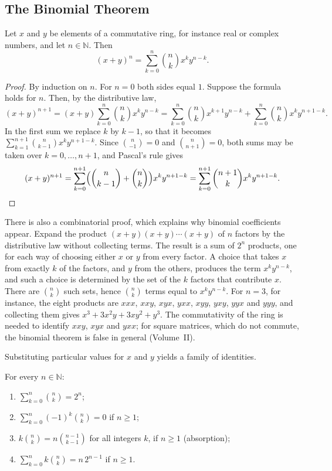 \subsection{The Binomial Theorem}

\begin{theorem}
\label{thm:binomial}
Let $x$ and $y$ be elements of a commutative ring, for instance real or complex numbers, and let $n\in\mathbb N$. Then
\[
(x+y)^n=\sum_{k=0}^{n}\binom nk x^ky^{n-k}.
\]
\end{theorem}

\begin{proof}
By induction on $n$. For $n=0$ both sides equal $1$. Suppose the formula holds for $n$. Then, by the distributive law,
\[
(x+y)^{n+1}=(x+y)\sum_{k=0}^{n}\binom nk x^ky^{n-k}=\sum_{k=0}^{n}\binom nk x^{k+1}y^{n-k}+\sum_{k=0}^{n}\binom nk x^ky^{n+1-k}.
\]
In the first sum we replace $k$ by $k-1$, so that it becomes $\sum_{k=1}^{n+1}\binom n{k-1}x^ky^{n+1-k}$. Since $\binom n{-1}=0$ and $\binom n{n+1}=0$, both sums may be taken over $k=0,\ldots,n+1$, and Pascal's rule gives
\[
(x+y)^{n+1}=\sum_{k=0}^{n+1}\Bigl(\binom n{k-1}+\binom nk\Bigr)x^ky^{n+1-k}=\sum_{k=0}^{n+1}\binom{n+1}{k}x^ky^{n+1-k}.
\]
\end{proof}

There is also a combinatorial proof, which explains why binomial coefficients appear. Expand the product $(x+y)(x+y)\cdots(x+y)$ of $n$ factors by the distributive law without collecting terms. The result is a sum of $2^n$ products, one for each way of choosing either $x$ or $y$ from every factor. A choice that takes $x$ from exactly $k$ of the factors, and $y$ from the others, produces the term $x^ky^{n-k}$, and such a choice is determined by the set of the $k$ factors that contribute $x$. There are $\binom nk$ such sets, hence $\binom nk$ terms equal to $x^ky^{n-k}$. For $n=3$, for instance, the eight products are $xxx$, $xxy$, $xyx$, $yxx$, $xyy$, $yxy$, $yyx$ and $yyy$, and collecting them gives $x^3+3x^2y+3xy^2+y^3$. The commutativity of the ring is needed to identify $xxy$, $xyx$ and $yxx$; for square matrices, which do not commute, the binomial theorem is false in general (Volume~II).

Substituting particular values for $x$ and $y$ yields a family of identities.

\begin{corollary}
\label{cor:binomial-sums}
For every $n\in\mathbb N$:
\begin{enumerate}
\item $\sum_{k=0}^{n}\binom nk=2^n$;
\item $\sum_{k=0}^{n}(-1)^k\binom nk=0$ if $n\ge1$;
\item $k\binom nk=n\binom{n-1}{k-1}$ for all integers $k$, if $n\ge1$ \quad(absorption);
\item $\sum_{k=0}^{n}k\binom nk=n\,2^{n-1}$ if $n\ge1$.
\end{enumerate}
\end{corollary}

